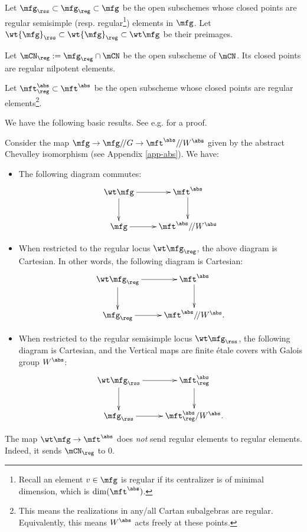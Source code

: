 	\begin{notn}
		Let $\mfg_\rss \subset \mfg_\reg \subset \mfg$ be the open subschemes whose closed points are regular semisimple (resp. regular\footnote{Recall an element $v\in \mfg$ is regular if its centralizer is of minimal dimension, which is $\dim(\mft^\abs)$.}) elements in $\mfg$. Let $\wt{\mfg}_\rss\subset \wt{\mfg}_\reg \subset \wt\mfg$ be their preimages.

		Let $\mCN_\reg:=\mfg_\reg\cap \mCN$ be the open subscheme of $\mCN$. Its closed points are regular nilpotent elements.

		Let $\mft_\reg^\abs\subset \mft^\abs$ be the open subscheme whose closed points are regular elements\footnote{This means the realizations in any/all Cartan subalgebras are regular. Equivalently, this means $W^\abs$ acts freely at these points.}.
	\end{notn}

	We have the following basic results. See e.g. \cite[Section 3.1]{CG} for a proof.

	\begin{prop}
		\label{prop-Groth-alt}
		Consider the map $\mfg \to \mfg/\!/G \to \mft^\abs/\!/W^\abs$ given by the abstract Chevalley isomorphism (see Appendix \ref{app-abs}). We have:
		\begin{itemize}
			\item[(1)]
				The following diagram commutes:
				\[
					\xymatrix{
						\wt\mfg \ar[r] \ar[d] & \mft^\abs \ar[d] \\
						\mfg \ar[r] & \mft^\abs/\!/W^\abs
					}
				\]
			\item[(2)]
				When restricted to the regular locus $\wt\mfg_\reg$, the above diagram is Cartesian. In other words, the following diagram is Cartesian:
				\[
					\xymatrix{
						\wt\mfg_\reg \ar[r] \ar[d] & \mft^\abs \ar[d] \\
						\mfg_\reg \ar[r] & \mft^\abs/\!/W^\abs.
					}
				\]
			\item[(3)]
				When restricted to the regular semisimple locus $\wt\mfg_\rss$, the following diagram is Cartesian, and the Vertical maps are finite étale covers with Galois group $W^\abs$:
				\[
					\xymatrix{
						\wt\mfg_\rss \ar[r] \ar[d] & \mft_\reg^\abs \ar[d] \\
						\mfg_\rss \ar[r] & \mft_\reg^\abs/W^\abs.
					}
				\]
		\end{itemize}

	\end{prop}

	\begin{warn}
		The map $\wt\mfg \to \mft^\abs$ does \emph{not} send regular elements to regular elements. Indeed, it sends $\mCN_\reg$ to $0$.
	\end{warn}


